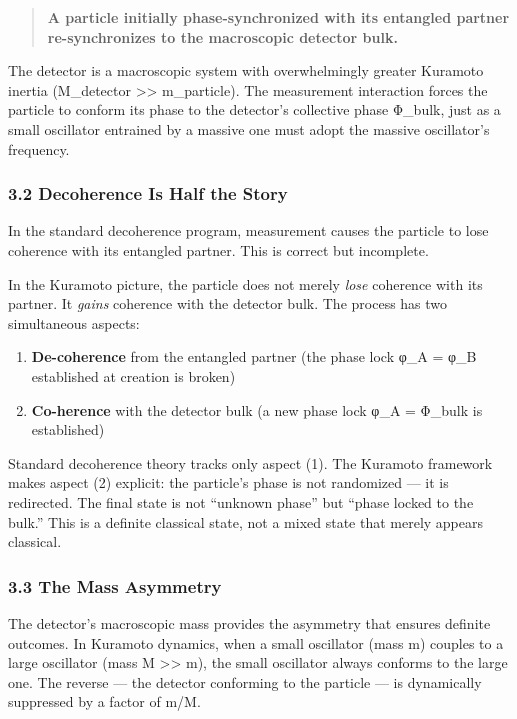\documentclass[
]{article}
\providecommand{\tightlist}{%
  \setlength{\itemsep}{0pt}\setlength{\parskip}{0pt}}
\begin{document}
\begin{quote}
\textbf{A particle initially phase-synchronized with its entangled
partner re-synchronizes to the macroscopic detector bulk.}
\end{quote}

The detector is a macroscopic system with overwhelmingly greater
Kuramoto inertia (M\_detector \textgreater\textgreater{} m\_particle).
The measurement interaction forces the particle to conform its phase to
the detector's collective phase Φ\_bulk, just as a small oscillator
entrained by a massive one must adopt the massive oscillator's
frequency.

\subsubsection{3.2 Decoherence Is Half the
Story}\label{decoherence-is-half-the-story}

In the standard decoherence program, measurement causes the particle to
lose coherence with its entangled partner. This is correct but
incomplete.

In the Kuramoto picture, the particle does not merely \emph{lose}
coherence with its partner. It \emph{gains} coherence with the detector
bulk. The process has two simultaneous aspects:

\begin{enumerate}
\def\labelenumi{\arabic{enumi}.}
\tightlist
\item
  \textbf{De-coherence} from the entangled partner (the phase lock φ\_A
  = φ\_B established at creation is broken)
\item
  \textbf{Co-herence} with the detector bulk (a new phase lock φ\_A =
  Φ\_bulk is established)
\end{enumerate}

Standard decoherence theory tracks only aspect (1). The Kuramoto
framework makes aspect (2) explicit: the particle's phase is not
randomized --- it is redirected. The final state is not ``unknown
phase'' but ``phase locked to the bulk.'' This is a definite classical
state, not a mixed state that merely appears classical.

\subsubsection{3.3 The Mass Asymmetry}\label{the-mass-asymmetry}

The detector's macroscopic mass provides the asymmetry that ensures
definite outcomes. In Kuramoto dynamics, when a small oscillator (mass
m) couples to a large oscillator (mass M \textgreater\textgreater{} m),
the small oscillator always conforms to the large one. The reverse ---
the detector conforming to the particle --- is dynamically suppressed by
a factor of m/M.
\end{document}
